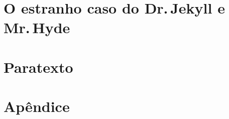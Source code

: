 \documentclass[showtrims,trimframe,12pt,spreadimages]{memoir}
\begin{document}
\part{O estranho caso do Dr.\,Jekyll e Mr.\,Hyde}
\part{Paratexto}
\part{Apêndice}
\end{document}
